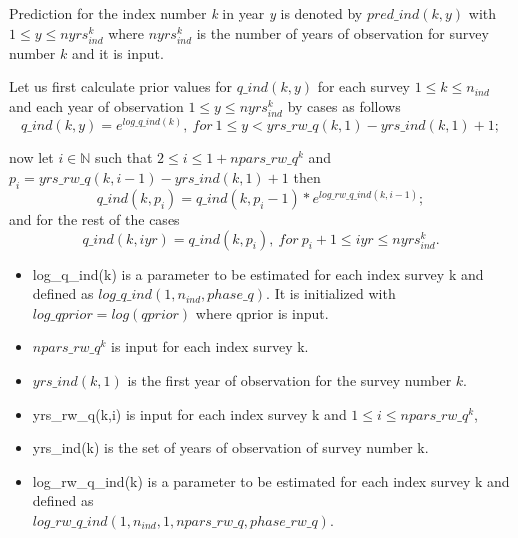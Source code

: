 \documentclass{article}
\begin{document}
Prediction for the index number \textit{k} in year \textit{y} is denoted by $pred\_ind(k,y)$ with $1\leq y \leq nyrs_{ind}^k$ where $nyrs_{ind}^k$ is the number of years of observation for survey number $k$ and it is input.

Let us first calculate prior values for $q\_ind(k,y)$ for each survey $1\leq k \leq n_{ind}$ and each year of observation $1\leq y \leq nyrs_{ind}^k$ by cases as follows
\begin{equation}
q\_ind(k,y)=e^{log\_q\_ind(k)}, \ for \ 1\leq y < yrs\_rw\_q(k,1)-yrs\_ind(k,1)+1;
\end{equation}

now let $i\in\mathbb{N}$ such that $2\leq i \leq 1+npars\_rw\_q^k$ and $p_i=yrs\_rw\_q(k,i-1)-yrs\_ind(k,1)+1$ then
\begin{equation}
     q\_ind(k,p_i)  = q\_ind(k,p_i-1)*e^{log\_rw\_q\_ind(k,i-1)};
\end{equation}
and for the rest of the cases
\begin{equation}
    q\_ind(k,iyr)  = q\_ind(k,p_i), \ for \ p_i+1\leq iyr \leq nyrs_{ind}^k.
\end{equation}

\begin{itemize}
    \item log\_q\_ind(k) is a parameter to be estimated for each index survey k and defined as $log\_q\_ind(1,n_{ind},phase\_q)$. It is initialized with $log\_qprior=log(qprior)$ where qprior is input.
    \item $npars\_rw\_q^k$ is input for each index survey k.
    \item $yrs\_ind(k,1)$ is the first year of observation for the survey number $k$.
    \item yrs\_rw\_q(k,i) is input for each index survey k and $1\leq i \leq npars\_rw\_q^k$, %
    \item yrs\_ind(k) is the set of years of observation of survey number k. 
    \item log\_rw\_q\_ind(k) is a parameter to be estimated for each index survey k and defined as \\ $log\_rw\_q\_ind(1,n_{ind},1,npars\_rw\_q,phase\_rw\_q) $.
\end{itemize}
\end{document}
